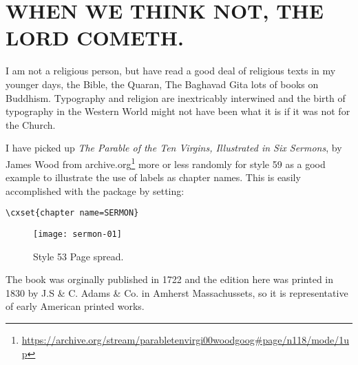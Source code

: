 


\chapter{WHEN WE THINK NOT, THE LORD COMETH.}

I am not a religious person, but have read a good deal of religious texts in my younger days, the Bible, the Quaran, The Baghavad Gita lots of books on Buddhism. Typography and religion are inextricably interwined and the birth of typography in the Western World  might not have been what it is if it was not for the Church.

I have picked up \emph{The Parable of the Ten Virgins, Illustrated in Six Sermons}, by James Wood from archive.org\footnote{\url{https://archive.org/stream/parabletenvirgi00woodgoog\#page/n118/mode/1up}} more or less randomly for style 59 as a good example to illustrate the use of labels as chapter names. This is easily accomplished with the  package by setting:

\begin{verbatim}
\cxset{chapter name=SERMON}
\end{verbatim}

\begin{figure}[ht]
\centering
\texttt{[image: sermon-01]}
\caption{Style 53 Page spread.}
\end{figure}

The book was orginally published in 1722 and the edition here was printed in 1830 by J.S \& C. Adams \& Co. in Amherst Massachussets, so it is representative of early American printed works.









